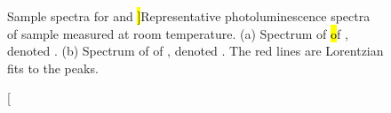 	\begin{figure}[htp]
		\begin{subfigure}[tp]{0.45\linewidth}
			\centering
			\caption{}\label{subfig::emnarrow}
		\end{subfigure}
		\hfill
		\begin{subfigure}[tp]{0.45\linewidth}
			\centering
			\caption{}\label{subfig::embroad}
		\end{subfigure}
		\caption[Sample \siv \pl spectra for \vl and \hl]{Representative photoluminescence spectra of sample \insituHao measured at room temperature. (a) Spectrum of \hl of , denoted \emnarrow. (b) Spectrum of \vl of , denoted \embroad. The red lines are Lorentzian fits to the peaks.}
		\label{fig::spectra}
	\end{figure}

